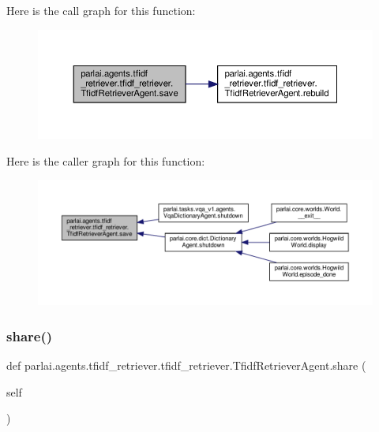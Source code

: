 Here is the call graph for this function\+:
\nopagebreak
\begin{figure}[H]
\begin{center}
\leavevmode
\includegraphics[width=350pt]{classparlai_1_1agents_1_1tfidf__retriever_1_1tfidf__retriever_1_1TfidfRetrieverAgent_af740335de006f8ead33b632afa1c4dcd_cgraph}
\end{center}
\end{figure}
Here is the caller graph for this function\+:
\nopagebreak
\begin{figure}[H]
\begin{center}
\leavevmode
\includegraphics[width=350pt]{classparlai_1_1agents_1_1tfidf__retriever_1_1tfidf__retriever_1_1TfidfRetrieverAgent_af740335de006f8ead33b632afa1c4dcd_icgraph}
\end{center}
\end{figure}
\mbox{\label{classparlai_1_1agents_1_1tfidf__retriever_1_1tfidf__retriever_1_1TfidfRetrieverAgent_afb395d155be90f557a1e8fc0cb38e94e}} 
\subsubsection{\texorpdfstring{share()}{share()}}
{\footnotesize\ttfamily def parlai.\+agents.\+tfidf\+\_\+retriever.\+tfidf\+\_\+retriever.\+Tfidf\+Retriever\+Agent.\+share (\begin{DoxyParamCaption}\item[{}]{self }\end{DoxyParamCaption})}



